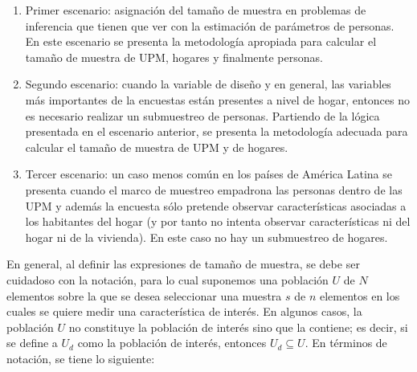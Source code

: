 \documentclass[
  10pt,
  spanish,
]{book}
\begin{document}
\begin{enumerate}
\def\labelenumi{\arabic{enumi}.}
\item
  Primer escenario: asignación del tamaño de muestra en problemas de inferencia que tienen que ver con la estimación de parámetros de personas. En este escenario se presenta la metodología apropiada para calcular el tamaño de muestra de UPM, hogares y finalmente personas.
\item
  Segundo escenario: cuando la variable de diseño y en general, las variables más importantes de la encuestas están presentes a nivel de hogar, entonces no es necesario realizar un submuestreo de personas. Partiendo de la lógica presentada en el escenario anterior, se presenta la metodología adecuada para calcular el tamaño de muestra de UPM y de hogares.
\item
  Tercer escenario: un caso menos común en los países de América Latina se presenta cuando el marco de muestreo empadrona las personas dentro de las UPM y además la encuesta sólo pretende observar características asociadas a los habitantes del hogar (y por tanto no intenta observar características ni del hogar ni de la vivienda). En este caso no hay un submuestreo de hogares.
\end{enumerate}

En general, al definir las expresiones de tamaño de muestra, se debe ser cuidadoso con la notación, para lo cual suponemos una población \(U\) de \(N\) elementos sobre la que se desea seleccionar una muestra \(s\) de \(n\) elementos en los cuales se quiere medir una característica de interés. En algunos casos, la población \(U\) no constituye la población de interés sino que la contiene; es decir, si se define a \(U_d\) como la población de interés, entonces \(U_d \subseteq U\). En términos de notación, se tiene lo siguiente:
\end{document}
